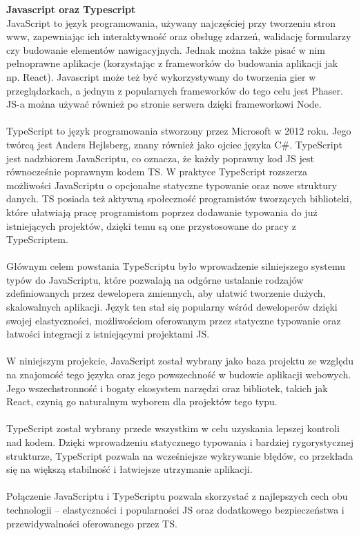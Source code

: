 \documentclass[12pt,a4paper]{article}
\begin{document}
\noindent \textbf{Javascript oraz Typescript}\\
JavaScript to język programowania, używany najczęściej przy tworzeniu stron www, zapewniając ich interaktywność oraz obsługę zdarzeń, walidację formularzy czy budowanie elementów nawigacyjnych. Jednak można także pisać w nim pełnoprawne aplikacje (korzystając z frameworków do budowania aplikacji jak np. React). Javascript może też być wykorzystywany do tworzenia gier w przeglądarkach, a jednym z popularnych frameworków do tego celu jest Phaser. JS-a można używać również po stronie serwera dzięki frameworkowi Node.
\\\\
TypeScript to język programowania stworzony przez Microsoft w 2012 roku. Jego twórcą jest Anders Hejlsberg, znany również jako ojciec języka C\#. TypeScript jest nadzbiorem JavaScriptu, co oznacza, że każdy poprawny kod JS jest równocześnie poprawnym kodem TS. W praktyce TypeScript rozszerza możliwości JavaScriptu o opcjonalne statyczne typowanie oraz nowe struktury danych. TS posiada też aktywną społeczność programistów tworzących biblioteki, które ułatwiają pracę programistom poprzez dodawanie typowania do już istniejących projektów, dzięki temu są one przystosowane do pracy z TypeScriptem.
\\\\
Głównym celem powstania TypeScriptu było wprowadzenie silniejszego systemu typów do JavaScriptu, które pozwalają na odgórne ustalanie rodzajów zdefiniowanych przez dewelopera zmiennych, aby ułatwić tworzenie dużych, skalowalnych aplikacji. Język ten stał się popularny wśród deweloperów dzięki swojej elastyczności, możliwościom oferowanym przez statyczne typowanie oraz łatwości integracji z istniejącymi projektami JS.
\\\\
W niniejszym projekcie, JavaScript został wybrany jako baza projektu ze względu na znajomość tego języka oraz jego powszechność w budowie aplikacji webowych. Jego wszechstronność i bogaty ekosystem narzędzi oraz bibliotek, takich jak React, czynią go naturalnym wyborem dla projektów tego typu.
\\\\
TypeScript został wybrany przede wszystkim w celu uzyskania lepszej kontroli nad kodem. Dzięki wprowadzeniu statycznego typowania i bardziej rygorystycznej strukturze, TypeScript pozwala na wcześniejsze wykrywanie błędów, co przekłada się na większą stabilność i łatwiejsze utrzymanie aplikacji.
\\\\
Połączenie JavaScriptu i TypeScriptu pozwala skorzystać z najlepszych cech obu technologii – elastyczności i popularności JS oraz dodatkowego bezpieczeństwa i przewidywalności oferowanego przez TS.
\\\\
\end{document}
